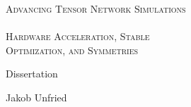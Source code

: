 \thispagestyle{empty}
\vspace{15mm}

\begin{center}
    \LARGE
    \textsc{
        Advancing Tensor Network Simulations
        \\ \textemdash \\
        Hardware Acceleration, Stable\\
        Optimization, and Symmetries
    }
\end{center}
\vspace{4ex}
\begin{center}
    \Large
    Dissertation
\end{center}
\vspace{2ex}
\begin{center} 
    Jakob Unfried
\end{center}


\vfill


